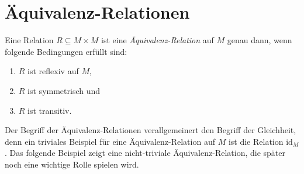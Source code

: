 \section{\"{A}quivalenz-Relationen \label{section:aequivalenz_relation}}
\begin{Definition}
Eine Relation $R \subseteq M \times M$  ist eine 
\emph{\"{A}quivalenz-Relation} auf $M$ genau dann, wenn folgende Bedingungen erf\"{u}llt sind:
\begin{enumerate}
\item $R$ ist reflexiv auf $M$,
\item $R$ ist symmetrisch und
\item $R$ ist transitiv. \eox
\end{enumerate}
\end{Definition}

Der Begriff der \"{A}quivalenz-Relationen verallgemeinert den Begriff der Gleichheit, denn
ein triviales Beispiel f\"{u}r eine \"{A}quivalenz-Relation auf $M$ ist die Relation $\mathrm{id}_M$.
Das folgende Beispiel zeigt eine nicht-triviale \"{A}quivalenz-Relation, die sp\"{a}ter noch eine wichtige
Rolle spielen wird.


